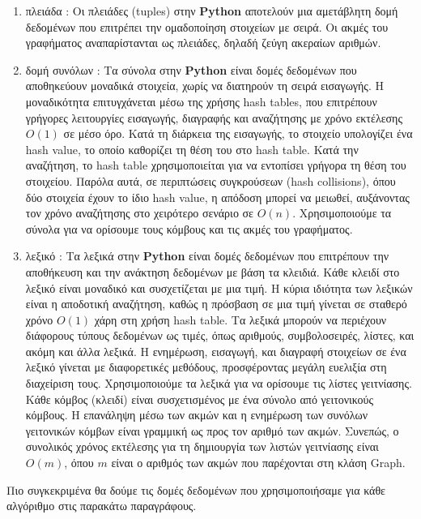 \begin{enumerate}
	\item πλειάδα : Οι πλειάδες (tuples) στην \textbf{Python} αποτελούν μια αμετάβλητη δομή δεδομένων  που επιτρέπει την ομαδοποίηση στοιχείων με σειρά. Οι ακμές του γραφήματος αναπαρίστανται ως πλειάδες, δηλαδή ζεύγη ακεραίων αριθμών.
	\item δομή συνόλων : Τα σύνολα στην  \textbf{Python} είναι δομές δεδομένων που  αποθηκεύουν μοναδικά στοιχεία, χωρίς να διατηρούν τη σειρά εισαγωγής. Η μοναδικότητα επιτυγχάνεται μέσω της χρήσης hash tables, που επιτρέπουν γρήγορες λειτουργίες εισαγωγής, διαγραφής και αναζήτησης με χρόνο εκτέλεσης $O(1)$ σε μέσο όρο. Κατά τη διάρκεια της εισαγωγής, το στοιχείο υπολογίζει ένα hash value, το οποίο καθορίζει τη θέση του στο hash table. Κατά την αναζήτηση, το hash table χρησιμοποιείται για να εντοπίσει γρήγορα τη θέση του στοιχείου. Παρόλα αυτά, σε περιπτώσεις συγκρούσεων (hash collisions), όπου δύο στοιχεία έχουν το ίδιο hash value, η απόδοση μπορεί να μειωθεί, αυξάνοντας τον χρόνο αναζήτησης στο χειρότερο σενάριο σε $O(n)$. Χρησιμοποιούμε τα σύνολα για να ορίσουμε τους κόμβους και τις ακμές του γραφήματος. 
	\item λεξικό : 
	Τα λεξικά στην \textbf{Python} είναι δομές δεδομένων που επιτρέπουν την αποθήκευση και την ανάκτηση δεδομένων με βάση τα κλειδιά. Κάθε κλειδί στο λεξικό είναι μοναδικό και συσχετίζεται με μια τιμή. Η κύρια ιδιότητα των λεξικών είναι η αποδοτική αναζήτηση, καθώς η πρόσβαση σε μια τιμή γίνεται σε σταθερό χρόνο $O(1)$ χάρη στη χρήση hash table. Τα λεξικά μπορούν να περιέχουν διάφορους τύπους δεδομένων ως τιμές, όπως αριθμούς, συμβολοσειρές, λίστες, και ακόμη και άλλα λεξικά. Η ενημέρωση, εισαγωγή, και διαγραφή στοιχείων σε ένα λεξικό γίνεται με διαφορετικές μεθόδους, προσφέροντας μεγάλη ευελιξία στη διαχείριση τους. Χρησιμοποιούμε τα λεξικά για να ορίσουμε τις λίστες γειτνίασης. Κάθε κόμβος (κλειδί) είναι συσχετισμένος με ένα σύνολο από γειτονικούς κόμβους. Η επανάληψη μέσω των ακμών και η ενημέρωση των συνόλων γειτονικών κόμβων είναι γραμμική ως προς τον αριθμό των ακμών. Συνεπώς, ο συνολικός χρόνος εκτέλεσης για τη δημιουργία των λιστών γειτνίασης είναι $O(m)$, όπου $m$ είναι ο αριθμός των ακμών που παρέχονται στη κλάση Graph.
\end{enumerate}

Πιο  συγκεκριμένα θα δούμε τις δομές δεδομένων που χρησιμοποιήσαμε για κάθε αλγόριθμο στις παρακάτω παραγράφους.

